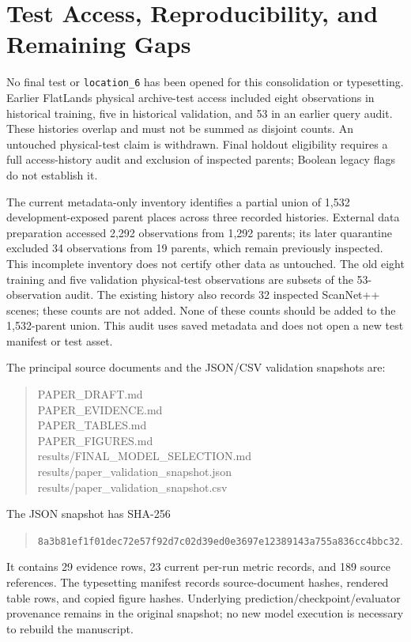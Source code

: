 \documentclass[conference,letterpaper,10pt,onecolumn]{IEEEtran}
\begin{document}
\clearpage
\section{Test Access, Reproducibility, and Remaining Gaps}
No final test or \texttt{location\_6} has been opened for this consolidation or typesetting. Earlier FlatLands physical archive-test access included eight observations in historical training, five in historical validation, and 53 in an earlier query audit. These histories overlap and must not be summed as disjoint counts. An untouched physical-test claim is withdrawn. Final holdout eligibility requires a full access-history audit and exclusion of inspected parents; Boolean legacy flags do not establish it.

The current metadata-only inventory identifies a partial union of 1,532 development-exposed parent places across three recorded histories. External data preparation accessed 2,292 observations from 1,292 parents; its later quarantine excluded 34 observations from 19 parents, which remain previously inspected. This incomplete inventory does not certify other data as untouched. The old eight training and five validation physical-test observations are subsets of the 53-observation audit. The existing history also records 32 inspected ScanNet++ scenes; these counts are not added. None of these counts should be added to the 1,532-parent union. This audit uses saved metadata and does not open a new test manifest or test asset.

The principal source documents and the JSON/CSV validation snapshots are:
\begin{quote}\small\ttfamily
PAPER\_DRAFT.md\\
PAPER\_EVIDENCE.md\\
PAPER\_TABLES.md\\
PAPER\_FIGURES.md\\
results/FINAL\_MODEL\_SELECTION.md\\
results/paper\_validation\_snapshot.json\\
results/paper\_validation\_snapshot.csv
\end{quote}
The JSON snapshot has SHA-256
\begin{quote}\footnotesize\ttfamily
\nolinkurl{8a3b81ef1f01dec72e57f92d7c02d39ed0e3697e12389143a755a836cc4bbc32}.
\end{quote}
It contains 29 evidence rows, 23 current per-run metric records, and 189 source references. The typesetting manifest records source-document hashes, rendered table rows, and copied figure hashes. Underlying prediction/checkpoint/evaluator provenance remains in the original snapshot; no new model execution is necessary to rebuild the manuscript.
\end{document}
